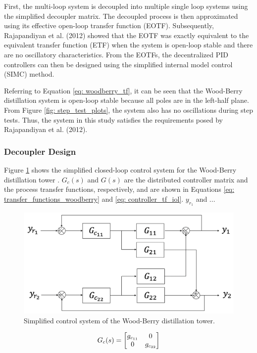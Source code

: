 First, the multi-loop system is decoupled into multiple single loop systems using the simplified decoupler matrix.  The decoupled process is then approximated using its effective open-loop transfer function (EOTF).  Subsequently, Rajapandiyan et al. (2012) showed that the EOTF was exactly equivalent to the equivalent transfer function (ETF) when the system is open-loop stable and there are no oscillatory characteristics.  From the EOTFs, the decentralized PID controllers can then be designed using the simplified internal model control (SIMC) method. 

Referring to Equation \ref{eq: woodberry_tf}, it can be seen that the Wood-Berry distillation system is open-loop stable because all poles are in the left-half plane.  From Figure \ref{fig: step_test_plots}, the system also has no oscillations during step tests. Thus, the system in this study satisfies the requirements posed by Rajapandiyan et al. (2012). 

\subsubsection{Decoupler Design}
Figure \ref{fig: control_loop_IOL} shows the simplified closed-loop control system for the Wood-Berry distillation tower \cite{decoupler_design}.  $G_c(s)$ and $G(s)$ are the distributed controller matrix and the process transfer functions, respectively, and are shown in Equations \ref{eq: transfer_functions_woodberry} and \ref{eq: controller_tf_iol}.  $y_{r_1}$ and ...

\begin{figure}
    \centering
    \includegraphics[scale=0.45]{images/pid_loop_iol.png}
    \caption{Simplified control system of the Wood-Berry distillation tower.}
    \label{fig: control_loop_IOL}
\end{figure}

\begin{equation}
    \centering
    G_{c}(s) = 
    \begin{bmatrix}
    g_{c_{11}}  &  0 \\ 
    0         &  g_{c_{22}}
    \end{bmatrix}
    \label{eq: controller_tf_iol}
\end{equation}

